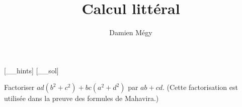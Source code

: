 




[_\jobname_hints]
[_\jobname_sol]


\title{Calcul littéral}
\author{Damien Mégy}
\maketitle

\begin{exo}
Factoriser $ad(b^2+c^2) + bc(a^2+d^2)$ par $ab+cd$. 
(Cette factorisation est utilisée dans la preuve des formules de Mahavira.)
\begin{hint}
\end{hint}
\begin{sol}
\end{sol}
\end{exo}

\begin{exo}
\begin{hint}
\end{hint}
\begin{sol}
\end{sol}
\end{exo}


\begin{exo}
\begin{hint}
\end{hint}
\begin{sol}
\end{sol}
\end{exo}




\indications
\correction



